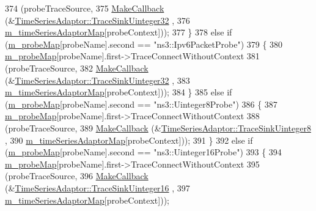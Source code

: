 \begin{DoxyCode}
374         (probeTraceSource,
375         \hyperlink{group__makecallbackmemptr_ga9376283685aa99d204048d6a4b7610a4}{MakeCallback} (&\hyperlink{classns3_1_1TimeSeriesAdaptor_add04eee090a86dc859b2415710c85b30}{TimeSeriesAdaptor::TraceSinkUinteger32}
      ,
376                       \hyperlink{classns3_1_1GnuplotHelper_ad013691ac007d20ac6c04261dda2432a}{m\_timeSeriesAdaptorMap}[probeContext]));
377     \}
378   \textcolor{keywordflow}{else} \textcolor{keywordflow}{if} (\hyperlink{classns3_1_1GnuplotHelper_aa4e50b82ac09e3ec99c1881f37f12ca5}{m\_probeMap}[probeName].second == \textcolor{stringliteral}{"ns3::Ipv6PacketProbe"})
379     \{
380       \hyperlink{classns3_1_1GnuplotHelper_aa4e50b82ac09e3ec99c1881f37f12ca5}{m\_probeMap}[probeName].first->TraceConnectWithoutContext
381         (probeTraceSource,
382         \hyperlink{group__makecallbackmemptr_ga9376283685aa99d204048d6a4b7610a4}{MakeCallback} (&\hyperlink{classns3_1_1TimeSeriesAdaptor_add04eee090a86dc859b2415710c85b30}{TimeSeriesAdaptor::TraceSinkUinteger32}
      ,
383                       \hyperlink{classns3_1_1GnuplotHelper_ad013691ac007d20ac6c04261dda2432a}{m\_timeSeriesAdaptorMap}[probeContext]));
384     \}
385   \textcolor{keywordflow}{else} \textcolor{keywordflow}{if} (\hyperlink{classns3_1_1GnuplotHelper_aa4e50b82ac09e3ec99c1881f37f12ca5}{m\_probeMap}[probeName].second == \textcolor{stringliteral}{"ns3::Uinteger8Probe"})
386     \{
387       \hyperlink{classns3_1_1GnuplotHelper_aa4e50b82ac09e3ec99c1881f37f12ca5}{m\_probeMap}[probeName].first->TraceConnectWithoutContext
388         (probeTraceSource,
389         \hyperlink{group__makecallbackmemptr_ga9376283685aa99d204048d6a4b7610a4}{MakeCallback} (&\hyperlink{classns3_1_1TimeSeriesAdaptor_a5f8fb38787207ef1b0cedc841bec7ff8}{TimeSeriesAdaptor::TraceSinkUinteger8}
      ,
390                       \hyperlink{classns3_1_1GnuplotHelper_ad013691ac007d20ac6c04261dda2432a}{m\_timeSeriesAdaptorMap}[probeContext]));
391     \}
392   \textcolor{keywordflow}{else} \textcolor{keywordflow}{if} (\hyperlink{classns3_1_1GnuplotHelper_aa4e50b82ac09e3ec99c1881f37f12ca5}{m\_probeMap}[probeName].second == \textcolor{stringliteral}{"ns3::Uinteger16Probe"})
393     \{
394       \hyperlink{classns3_1_1GnuplotHelper_aa4e50b82ac09e3ec99c1881f37f12ca5}{m\_probeMap}[probeName].first->TraceConnectWithoutContext
395         (probeTraceSource,
396         \hyperlink{group__makecallbackmemptr_ga9376283685aa99d204048d6a4b7610a4}{MakeCallback} (&\hyperlink{classns3_1_1TimeSeriesAdaptor_ae292de4e1a29362d3ee5e26150244cb6}{TimeSeriesAdaptor::TraceSinkUinteger16}
      ,
397                       \hyperlink{classns3_1_1GnuplotHelper_ad013691ac007d20ac6c04261dda2432a}{m\_timeSeriesAdaptorMap}[probeContext]));

\end{DoxyCode}
